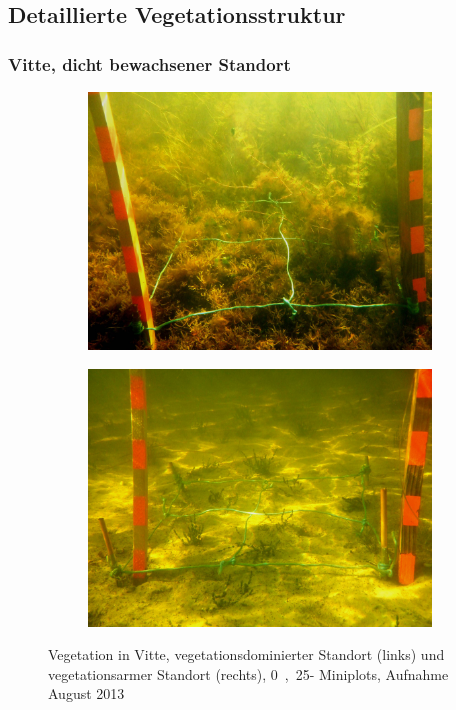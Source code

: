 \subsection{Detaillierte Vegetationsstruktur}


\subsubsection{Vitte, dicht bewachsener Standort}

\begin{figure}[!htb]
        \centering
        \begin{subfigure}[htb]{0.45\textwidth}
                \includegraphics[width=\textwidth]{images/plotpictures/BSP_V+M}
        \end{subfigure}
        \begin{subfigure}[htb]{0.45\textwidth}
                \includegraphics[width=\textwidth]{images/plotpictures/Bsp_V-M}
        \end{subfigure}
        \caption[Fotoaufnahmen der Vegetation in Vitte]{Vegetation in Vitte, vegetationsdominierter Standort 					(links) und  vegetationsarmer Standort (rechts), \unit{0,25}{\metre\squared}- Miniplots, 						Aufnahme August 2013}
        \label{fig:fotos_vitte}
\end{figure}


